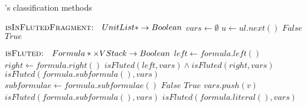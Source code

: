 \begin{algorithm}[H]
    \caption{'s classification methods}\label{alg:formula-classifier}
    \begin{algorithmic}[1]
        \Statex{}  \(\textsc{isInFlutedFragment:} \quad UnitList* \to Boolean\)
              \State{} \(vars \gets \emptyset\)
              \State{} \(u \gets ul.next()\)
                \State{} \Return{} \(False\)
              \EndIf{}
            \EndWhile{}
            \State{} \Return{} \(True\)
        \EndFunction{}
    \end{algorithmic}

    \begin{algorithmic}[1]
        \Statex{}  \(\textsc{isFluted:} \quad Formula* \times VStack\to Boolean\)
                \Case{\(\implies, \iff\)}
                    \State{} \(left \gets formula.left()\)
                    \State{} \(right \gets formula.right()\)
                    \State{} \Return{} \(isFluted(left,vars) \land isFluted(right,vars)\)
                \EndCase{}
                \Case{\(\neg\)}
                    \State{} \Return{} \(isFluted(formula.subformula(),vars)\)
                \EndCase{}
                \Case{\(\land, \lor\)}
                    \State{} \(subformulae \gets formula.subformulae()\)
                            \State{} \Return{} \(False\)
                        \EndIf{}
                    \EndFor{}
                    \State{} \Return{} \(True\)
                \EndCase{}
                \Case{\(\forall, \exists\)}
                        \State{} \(vars.push(v)\)
                    \EndFor{}
                    \State{} \Return{} \(isFluted(formula.subformula(),vars)\)
                \EndCase{}
                    \State{} \Return{} \(isFluted(formula.literal(),vars)\)
                \EndCase{}
            \EndSwitch{}
        \EndFunction{}
    \end{algorithmic}
\end{algorithm}
